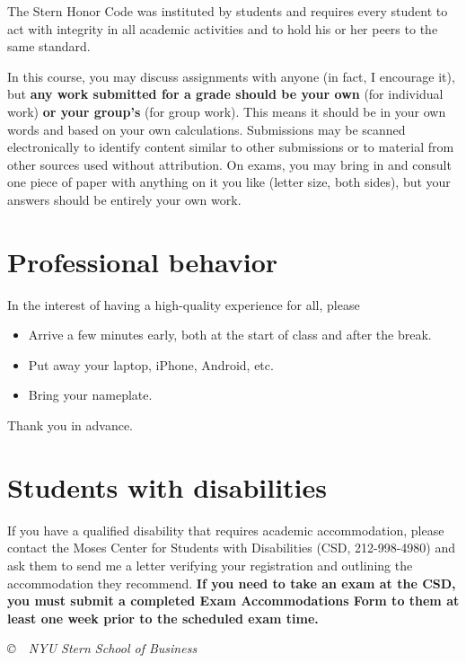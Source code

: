 \documentclass[12pt]{article}
\begin{document}
The Stern Honor Code was instituted by students
and requires every student to act with integrity in all
academic activities and to hold his or her peers to the same
standard.

In this course, you may discuss assignments with anyone
(in fact, I encourage it), but {\bf any work submitted for a
grade should be your own} (for individual work) {\bf or your group's}
(for group work).
This means it should be in your own words and based on your own calculations.
Submissions may be scanned electronically to identify
content similar to other submissions or to material from other sources
used without attribution.
On exams, you may bring in and consult one piece
of paper with anything on it you like (letter size, both sides),
but your answers should be entirely your own work.




\section{Professional behavior}

In the interest of having a high-quality experience for all,
please
%
\begin{itemize}
\item Arrive a few minutes early,
both at the start of class and after the break.

\item Put away your laptop, iPhone, Android, etc.

\item Bring your nameplate.

%
\end{itemize}
Thank you in advance.


\section{Students with disabilities}

If you have a qualified disability that requires academic accommodation,
please contact the Moses Center for Students with Disabilities (CSD, 212-998-4980) and ask them to
send me a letter verifying your registration and outlining the accommodation they recommend.
{\bf If you need to take an exam at the CSD,
you must submit a completed Exam Accommodations Form to them
at least one week prior to the scheduled exam time.}

\vfill
\centerline{\it \copyright \ \number\year \ NYU Stern School of Business}
\end{document}

